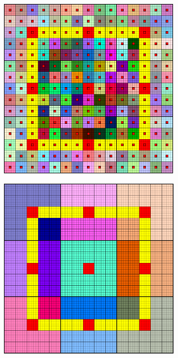 \begin{figure}[htbp]
  \begin{subfigure}[t]{0.3\textwidth}
    \centerline{\includegraphics[width=0.9\linewidth]{figs/square/square_cart_struct_cell_ml_lvl1_grid}}
  \end{subfigure}
  \hfill
  \begin{subfigure}[t]{0.3\textwidth}
    \centerline{\includegraphics[width=0.9\linewidth]{figs/square/square_cart_struct_cell_ml_lvl2_grid}}

\end{subfigure}
\end{figure}
